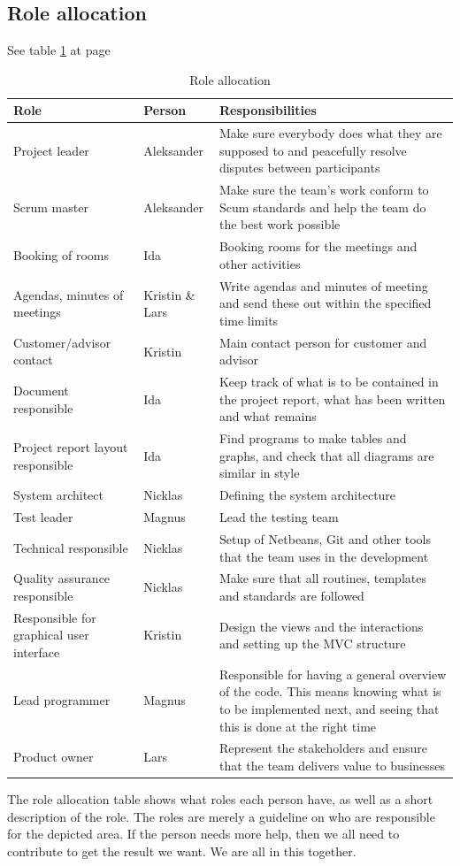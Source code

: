 \subsection{Role allocation}
See table \ref{tab:roleallocation} at page \pageref{tab:roleallocation}
\begin{table}
\begin{tabularx}{\linewidth}{>{\setlength\hsize{.5\hsize}}X|>{\setlength\hsize{0.3\hsize}}X|>{\setlength\hsize{1\hsize}}X} \hline
\textbf{Role} & \textbf{Person} & \textbf{Responsibilities} \\ \hline \hline
Project leader & Aleksander & Make sure everybody does what they are supposed to and peacefully resolve disputes between participants \\  \hline
Scrum master & Aleksander & Make sure the team’s work conform to Scum standards and help the team do the best work possible \\ \hline
Booking of rooms & Ida & Booking rooms for the meetings and other activities \\ \hline
Agendas, minutes of meetings & Kristin \& Lars &Write agendas and minutes of meeting and send these out within the specified time limits \\ \hline
Customer/advisor contact & Kristin & Main contact person for customer and advisor \\ \hline
Document responsible & Ida &Keep track of what is to be contained in the project report, what has been written and what remains \\ \hline
Project report layout responsible & Ida &Find programs to make tables and graphs, and check that all diagrams are similar in style \\ \hline
System architect & Nicklas & Defining the system architecture \\ \hline
Test leader & Magnus & Lead the testing team \\ \hline
Technical responsible & Nicklas & Setup of Netbeans, Git and other tools that the team uses in the development \\ \hline
Quality assurance responsible & Nicklas & Make sure that all routines, templates and standards are followed \\ \hline
Responsible for graphical user interface & Kristin & Design the views and the interactions and setting up the MVC structure \\ \hline
Lead programmer & Magnus & Responsible for having a general overview of the code. This means knowing what is to be implemented next, and seeing that this is done at the right time \\ \hline
Product owner & Lars & Represent the stakeholders and ensure that the team delivers value to businesses\\ \hline
\end{tabularx}
\caption {Role allocation} \label{tab:roleallocation}
\end{table}
The role allocation table shows what roles each person have, as well as a short description of the role. The roles are merely a guideline on who are responsible for the depicted area. If the person needs more help, then we all need to contribute to get the result we want. We are all in this together.

